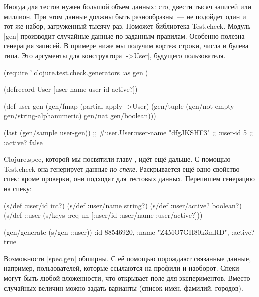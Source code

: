 
Иногда для тестов нужен большой объем данных: сто, двести тысяч записей или
миллион. При этом данные должны быть разнообразны~--- не подойдет один и тот же
набор, загруженный тысячу раз. Поможет библиотека
Test.check. Модуль \spverb|gen|
производит случайные данные по заданным правилам. Особенно полезна генерация
записей. В примере ниже мы получим кортеж строки, числа и булева типа. Это
аргументы для конструктора \spverb|->User|, будущего пользователя.

\begin{english}
  \begin{clojure}
(require '[clojure.test.check.generators :as gen])

(defrecord User [user-name user-id active?])

(def user-gen
  (gen/fmap (partial apply ->User)
            (gen/tuple (gen/not-empty gen/string-alphanumeric)
                       gen/nat
                       gen/boolean)))

(last (gen/sample user-gen))
;; #user.User{:user-name "dfgJKSHF3"
;;            :user-id 5
;;            :active? false}
  \end{clojure}
\end{english}

Clojure.spec, которой мы посвятили главу , ид\"{е}т ещ\"{е} дальше. С
помощью Test.check она генерирует данные \emph{по спеке}. Раскрывается ещ\"{е}
одно свойство спек: кроме проверки, они подходят для тестовых данных. Перепишем
генерацию на спеку:

\begin{english}
  \begin{clojure}
(s/def :user/id int?)
(s/def :user/name string?)
(s/def :user/active? boolean?)
(s/def ::user (s/keys :req-un [:user/id :user/name :user/active?]))

(gen/generate (s/gen ::user))
{:id 88546920, :name "Z4MO7GH80k3mRD", :active? true}
  \end{clojure}
\end{english}

Возможности \spverb|spec.gen| обширны. С е\"{е} помощью порождают связанные данные,
например, пользователей, которые ссылаются на профили и наоборот. Спеки могут
быть любой вложенности, что открывает поле для экспериментов. Вместо случайных
величин можно задать варианты (список им\"{е}н, фамилий, городов).

